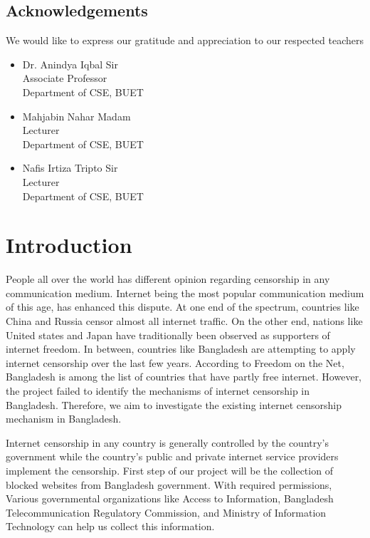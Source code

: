 \documentclass[12pt]{article}
\newcommand{\ackname}{Acknowledgements}
\begin{document}
\subsection*{\ackname}
We would like to express our gratitude and appreciation to our respected teachers
\begin{itemize}
\item Dr. Anindya Iqbal Sir\\Associate Professor\\Department of CSE, BUET
\item Mahjabin Nahar Madam\\Lecturer\\Department of CSE, BUET
\item Nafis Irtiza Tripto Sir\\Lecturer\\Department of CSE, BUET
\end{itemize}


\newpage
\tableofcontents
\newpage
\listoffigures
\newpage

\section{Introduction}
People all over the world has different opinion regarding censorship in any communication medium. Internet being the most popular communication medium of this age, has 
enhanced this dispute. At one end of the spectrum, countries like China and Russia censor almost all internet traffic. On the other end, nations like United states and Japan have traditionally been observed as supporters of internet freedom. In between, countries like Bangladesh are attempting to apply internet censorship over the last few years. According to Freedom on the Net, Bangladesh is among the list of countries that have partly free internet. However, the project failed to identify the mechanisms of internet censorship in Bangladesh. Therefore, we aim to investigate the existing internet censorship mechanism in Bangladesh.


Internet censorship in any country is generally controlled by the country’s government while the country’s public and private internet service providers implement the censorship. First step of our project will be the collection of blocked websites from Bangladesh government. With required permissions, Various governmental organizations like Access to Information, Bangladesh Telecommunication Regulatory Commission, and Ministry of Information Technology can help us collect this information.
\end{document}
